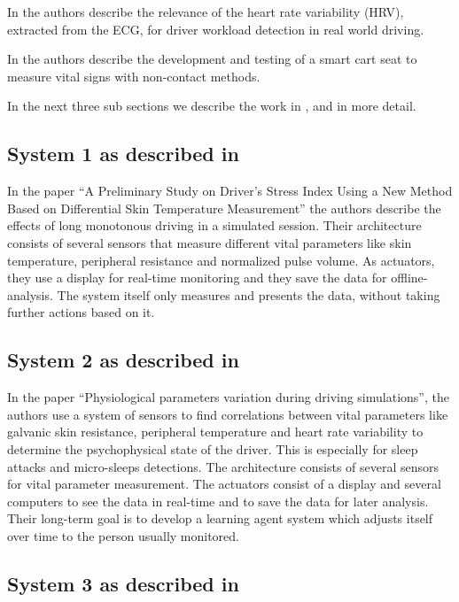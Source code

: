 \documentclass[a4paper]{article}
\begin{document}
In \cite{eilebrecht:12} the authors describe the relevance of the heart rate variability (HRV), extracted from the ECG, for driver workload detection in real world driving.

In \cite{walter:11} the authors describe the development and testing of a smart cart seat to measure vital signs with non-contact methods.

In the next three sub sections we describe the work in \cite{yamakoshi:07}, \cite{Zocchi:07} and \cite{angelo:10} in more detail.
\subsection{System 1 as described in\cite{yamakoshi:07}}
\indent
\indent In the paper ``A Preliminary Study on Driver's Stress Index Using a New Method Based on Differential Skin Temperature Measurement'' the authors describe the effects of long monotonous driving in a simulated session. Their architecture consists of several sensors that measure different vital parameters like skin temperature, peripheral resistance and normalized pulse volume. As actuators, they use a display for real-time monitoring and they save the data for offline-analysis.
The system itself only measures and presents the data, without taking further actions based on it.
\subsection{System 2 as described in \cite{Zocchi:07}}
\indent
\indent In the paper ``Physiological parameters variation during driving simulations'', the authors use a system of sensors to find correlations between vital parameters like galvanic skin resistance, peripheral temperature and heart rate variability to determine the psychophysical state of the driver. This is especially for sleep attacks and micro-sleeps detections. The architecture consists of several sensors for vital parameter measurement. The actuators consist of a display and several computers to see the data in real-time and to save the data for later analysis. Their long-term goal is to develop a learning agent system which adjusts itself over time to the person usually monitored.
\subsection{System 3 as described in \cite{angelo:10}}
\indent
\indent 
%
%
\end{document}
